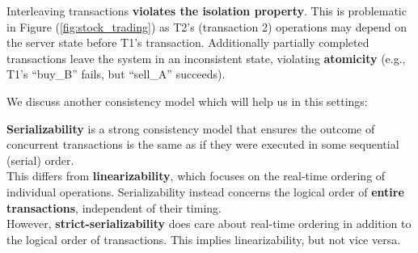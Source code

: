 \noindent
Interleaving transactions \textbf{violates the isolation property}. This is problematic in 
Figure (\ref{fig:stock_trading}) as T2's (transaction 2) operations may depend on the server 
state before T1's transaction. Additionally partially completed transactions leave the system in an inconsistent state, violating
\textbf{atomicity}
(e.g., T1's ``buy\_B'' fails, but ``sell\_A'' succeeds).

\newpage

\noindent
We discuss another consistency model which will help us in this settings:
\begin{Def}[Serializability]

    \label{def:serializability}
    
    \textbf{Serializability} is a strong consistency model that ensures the outcome of concurrent transactions is the same as if they were executed in some sequential (serial) order.\\
    
    \noindent
    This differs from \textbf{linearizability}, which focuses on the real-time ordering of individual operations. Serializability instead concerns the logical order of \textbf{entire transactions}, independent of their timing.\\ 

    \noindent
    However, \textbf{strict-serializability} does care about real-time ordering in addition to the logical order of transactions. This implies linearizability, but not vice versa.
    
    \end{Def}

